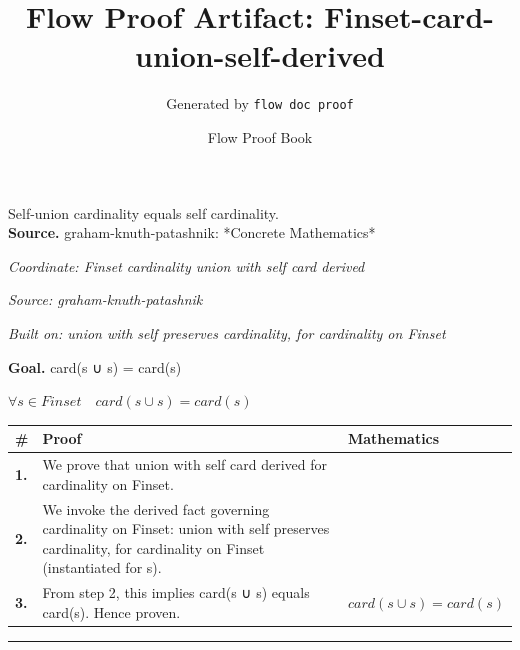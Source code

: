 \documentclass[11pt]{article}
\title{Flow Proof Artifact: Finset-card-union-self-derived}
\author{Generated by \texttt{flow doc proof}}
\date{Flow Proof Book}
\theoremstyle{definition}
\begin{document}
\maketitle
Self-union cardinality equals self cardinality.\\[0.5em]
\textbf{Source.} graham-knuth-patashnik: *Concrete Mathematics*\\[0.5em]
\bigskip
{}\par
\smallskip\noindent\textit{Coordinate: Finset \cdot cardinality \cdot union with self card derived}\par
\smallskip\noindent\textit{Source: graham-knuth-patashnik}\par
\smallskip\noindent\textit{Built on: union with self preserves cardinality, for cardinality on Finset}\par
\medskip
\noindent\textbf{Goal.} card(s ∪ s) = card(s)\par
\noindent$\displaystyle \forall s \in Finset\quad card(s ∪ s) = card(s)$\par
\medskip
\noindent
\begin{tabular}{@{} >{\raggedright\arraybackslash}p{} >{\raggedright\arraybackslash}p{} >{\raggedleft\arraybackslash}p{} @{}}
\textbf{\#} & \textbf{Proof} & \textbf{Mathematics} \\
\midrule
\textbf{1.} & We prove that union with self card derived for cardinality on Finset. & \\[0.45em]
\textbf{2.} & We invoke the derived fact governing cardinality on Finset: union with self preserves cardinality, for cardinality on Finset (instantiated for s). & \\[0.45em]
\textbf{3.} & From step 2, this implies card(s ∪ s) equals card(s). Hence proven. & $\displaystyle card(s ∪ s) = card(s)$ \\[0.45em]
\bottomrule
\end{tabular}
\label{thm:Finset-cardinality-union_with_self_card_derived}
\par\medskip\hrule
\end{document}
